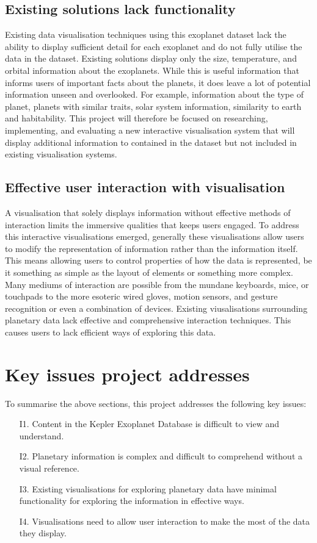 \subsection{Existing solutions lack functionality}
Existing data visualisation techniques using this exoplanet dataset lack the
ability to display sufficient detail for each exoplanet and do not fully utilise
the data in the dataset. Existing solutions display only the size, temperature,
and orbital information about the exoplanets. While this is useful information
that informs users of important facts about the planets, it does leave a lot of
potential information unseen and overlooked. For example, information about the
type of planet, planets with similar traits, solar system information,
similarity to earth and habitability. This project will therefore be focused on
researching, implementing, and evaluating a new interactive visualisation system
that will display additional information to contained in the dataset but not
included in existing visualisation systems.

\subsection{Effective user interaction with visualisation}
A visualisation that solely displays information without effective methods of
interaction limits the immersive qualities that keeps users engaged. To address
this interactive visualisations emerged, generally these visualisations allow
users to modify the representation of information rather than the information
itself. This means allowing users to control properties of how the data is
represented, be it something as simple as the layout of elements or something
more complex. Many mediums of interaction are possible from the mundane
keyboards, mice, or touchpads to the more esoteric wired gloves, motion sensors,
and gesture recognition or even a combination of devices. Existing
viusalisations surrounding planetary data lack effective and comprehensive
interaction techniques. This causes users to lack efficient ways of exploring this data.

\section{Key issues project addresses}
To summarise the above sections, this project addresses the following key
issues:
\begin{enumerate}
 \item[I1.] Content in the Kepler Exoplanet Database is difficult to view and understand.
 \item[I2.] Planetary information is complex and difficult to comprehend without
a visual reference.
 \item[I3.] Existing visualisations for exploring planetary data have minimal functionality for exploring the information in effective ways.
 \item[I4.] Visualisations need to allow user interaction to make the most of the data they display.
\end{enumerate}

